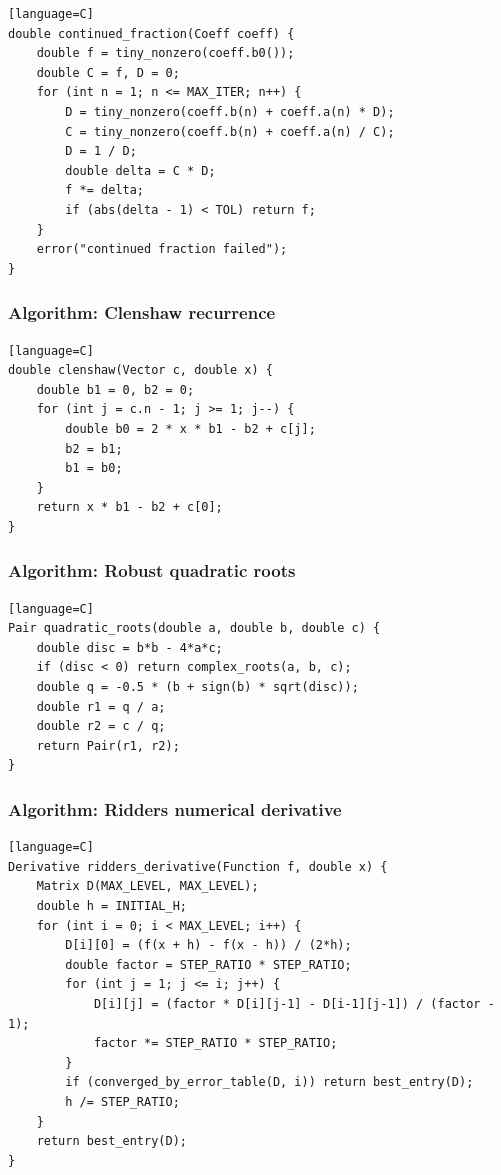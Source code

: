 \documentclass[11pt]{article}
\begin{document}
\begin{verbatim}[language=C]
double continued_fraction(Coeff coeff) {
    double f = tiny_nonzero(coeff.b0());
    double C = f, D = 0;
    for (int n = 1; n <= MAX_ITER; n++) {
        D = tiny_nonzero(coeff.b(n) + coeff.a(n) * D);
        C = tiny_nonzero(coeff.b(n) + coeff.a(n) / C);
        D = 1 / D;
        double delta = C * D;
        f *= delta;
        if (abs(delta - 1) < TOL) return f;
    }
    error("continued fraction failed");
}
\end{verbatim}

\subsubsection{Algorithm: Clenshaw recurrence}\label{algorithm-clenshaw-recurrence}

\begin{verbatim}[language=C]
double clenshaw(Vector c, double x) {
    double b1 = 0, b2 = 0;
    for (int j = c.n - 1; j >= 1; j--) {
        double b0 = 2 * x * b1 - b2 + c[j];
        b2 = b1;
        b1 = b0;
    }
    return x * b1 - b2 + c[0];
}
\end{verbatim}

\subsubsection{Algorithm: Robust quadratic roots}\label{algorithm-robust-quadratic-roots}

\begin{verbatim}[language=C]
Pair quadratic_roots(double a, double b, double c) {
    double disc = b*b - 4*a*c;
    if (disc < 0) return complex_roots(a, b, c);
    double q = -0.5 * (b + sign(b) * sqrt(disc));
    double r1 = q / a;
    double r2 = c / q;
    return Pair(r1, r2);
}
\end{verbatim}

\subsubsection{Algorithm: Ridders numerical derivative}\label{algorithm-ridders-numerical-derivative}

\begin{verbatim}[language=C]
Derivative ridders_derivative(Function f, double x) {
    Matrix D(MAX_LEVEL, MAX_LEVEL);
    double h = INITIAL_H;
    for (int i = 0; i < MAX_LEVEL; i++) {
        D[i][0] = (f(x + h) - f(x - h)) / (2*h);
        double factor = STEP_RATIO * STEP_RATIO;
        for (int j = 1; j <= i; j++) {
            D[i][j] = (factor * D[i][j-1] - D[i-1][j-1]) / (factor - 1);
            factor *= STEP_RATIO * STEP_RATIO;
        }
        if (converged_by_error_table(D, i)) return best_entry(D);
        h /= STEP_RATIO;
    }
    return best_entry(D);
}
\end{verbatim}
\end{document}

